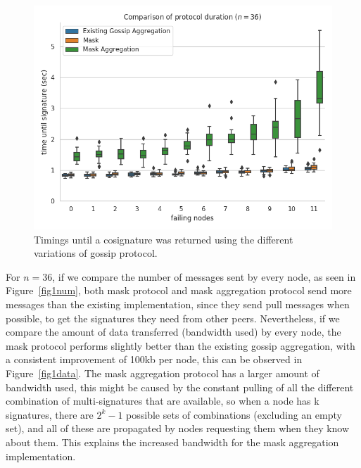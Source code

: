 \begin{figure}[H]
    \centering
    \includegraphics[width=1\textwidth]{images/aggregation_round_wall_sum_36.png}
    \caption{Timings until a cosignature was returned using the different variations of gossip protocol. }
    \label{fig1time}
\end{figure}

For $n = 36$, if we compare the number of messages sent by every node, as seen in Figure~\ref{fig1num}, both mask protocol and mask aggregation protocol send more messages than the existing implementation, since they send pull messages when possible, to get the signatures they need from other peers. Nevertheless, if we compare the amount of data transferred (bandwidth used) by every node, the mask protocol performs slightly better than the existing gossip aggregation, with a consistent improvement of 100kb per node, this can be observed in Figure~\ref{fig1data}. The mask aggregation protocol has a larger amount of bandwidth used, this might be caused by the constant pulling of all the different combination of multi-signatures that are available, so when a node has k signatures, there are $2^{k} - 1$ possible sets of combinations (excluding an empty set), and all of these are propagated by nodes requesting them when they know about them. This explains the increased bandwidth for the mask aggregation implementation.

